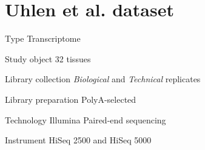 \chapter{Uhlen et al. dataset}
\label{ch:uhlenData}

\begin{eqlist}
    \item[Type] Transcriptome
    \item[Study object] 32 tissues
    \item[Library collection] \emph{Biological} and \emph{Technical} replicates
    \item[Library preparation] PolyA-selected
    \item[Technology] Illumina Paired-end sequencing
    \item[Instrument] HiSeq 2500 and HiSeq 5000
\end{eqlist}

